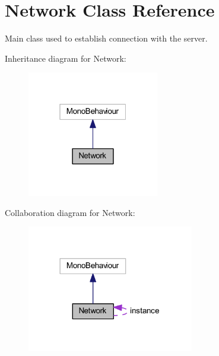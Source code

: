 \hypertarget{class_network}{}\section{Network Class Reference}
\label{class_network}


Main class used to establish connection with the server.  




Inheritance diagram for Network\+:\nopagebreak
\begin{figure}[H]
\begin{center}
\leavevmode
\includegraphics[width=163pt]{class_network__inherit__graph}
\end{center}
\end{figure}


Collaboration diagram for Network\+:\nopagebreak
\begin{figure}[H]
\begin{center}
\leavevmode
\includegraphics[width=206pt]{class_network__coll__graph}
\end{center}
\end{figure}
